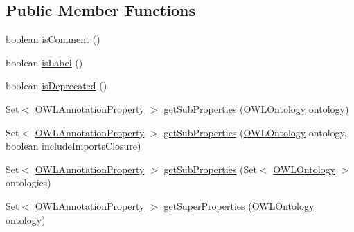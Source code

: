 \subsection*{Public Member Functions}
\begin{DoxyCompactItemize}
\item 
boolean \hyperlink{interfaceorg_1_1semanticweb_1_1owlapi_1_1model_1_1_o_w_l_annotation_property_ae1b895ad276b44fedda218b8c025e5ef}{is\-Comment} ()
\item 
boolean \hyperlink{interfaceorg_1_1semanticweb_1_1owlapi_1_1model_1_1_o_w_l_annotation_property_a366f126fa7b72f66b06c98f677d674b6}{is\-Label} ()
\item 
boolean \hyperlink{interfaceorg_1_1semanticweb_1_1owlapi_1_1model_1_1_o_w_l_annotation_property_ae28fdc43ed1a709d1072b4f96281bb97}{is\-Deprecated} ()
\item 
Set$<$ \hyperlink{interfaceorg_1_1semanticweb_1_1owlapi_1_1model_1_1_o_w_l_annotation_property}{O\-W\-L\-Annotation\-Property} $>$ \hyperlink{interfaceorg_1_1semanticweb_1_1owlapi_1_1model_1_1_o_w_l_annotation_property_a322bc127118a01b0fe0d424913bcb87c}{get\-Sub\-Properties} (\hyperlink{interfaceorg_1_1semanticweb_1_1owlapi_1_1model_1_1_o_w_l_ontology}{O\-W\-L\-Ontology} ontology)
\item 
Set$<$ \hyperlink{interfaceorg_1_1semanticweb_1_1owlapi_1_1model_1_1_o_w_l_annotation_property}{O\-W\-L\-Annotation\-Property} $>$ \hyperlink{interfaceorg_1_1semanticweb_1_1owlapi_1_1model_1_1_o_w_l_annotation_property_a05d454902d4259c5359c53a159f3251f}{get\-Sub\-Properties} (\hyperlink{interfaceorg_1_1semanticweb_1_1owlapi_1_1model_1_1_o_w_l_ontology}{O\-W\-L\-Ontology} ontology, boolean include\-Imports\-Closure)
\item 
Set$<$ \hyperlink{interfaceorg_1_1semanticweb_1_1owlapi_1_1model_1_1_o_w_l_annotation_property}{O\-W\-L\-Annotation\-Property} $>$ \hyperlink{interfaceorg_1_1semanticweb_1_1owlapi_1_1model_1_1_o_w_l_annotation_property_a01b1c16de8b37979e75e988a73402713}{get\-Sub\-Properties} (Set$<$ \hyperlink{interfaceorg_1_1semanticweb_1_1owlapi_1_1model_1_1_o_w_l_ontology}{O\-W\-L\-Ontology} $>$ ontologies)
\item 
Set$<$ \hyperlink{interfaceorg_1_1semanticweb_1_1owlapi_1_1model_1_1_o_w_l_annotation_property}{O\-W\-L\-Annotation\-Property} $>$ \hyperlink{interfaceorg_1_1semanticweb_1_1owlapi_1_1model_1_1_o_w_l_annotation_property_a3d4642b8e441cb5fc3ec4764710ccf15}{get\-Super\-Properties} (\hyperlink{interfaceorg_1_1semanticweb_1_1owlapi_1_1model_1_1_o_w_l_ontology}{O\-W\-L\-Ontology} ontology)

\end{DoxyCompactItemize}
